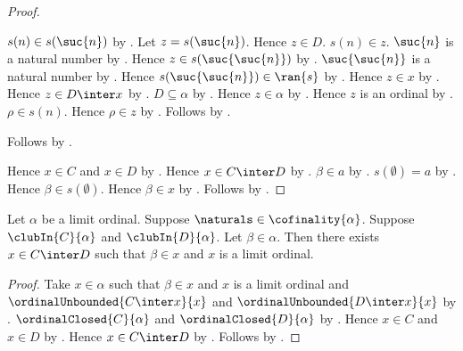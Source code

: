 \begin{proof}
\begin{subproof}
\begin{subproof}
            $s(n)\in s(\suc{n})$
                by .
            Let $z=s(\suc{n})$.
            Hence $z\in D$.
            $s(n)\in z$.
            $\suc{n}$ is a natural number by .
            Hence $z\in s(\suc{\suc{n}})$
                by .
            $\suc{\suc{n}}$ is a natural number
                by .
            Hence $s(\suc{\suc{n}})\in\ran{s}$
                by .
            Hence $z\in x$ by .
            Hence $z\in D\inter x$ by .
            $D\subseteq\alpha$ by .
            Hence $z\in\alpha$ by .
            Hence $z$ is an ordinal by .
            $\rho\in s(n)$.
            Hence $\rho\in z$ by .
            Follows by \auto.
        \end{subproof}
        Follows by .
    \end{subproof}
    Hence $x\in C$ and $x\in D$ by .
    Hence $x\in C\inter D$ by .
    $\beta\in a$ by .
    $s(\emptyset)=a$ by .
    Hence $\beta\in s(\emptyset)$.
    Hence $\beta\in x$ by .
    Follows by \auto.
\end{proof}

\begin{theorem}\label{two_clubs_have_common_point_above}
    Let $\alpha$ be a limit ordinal.
    Suppose $\naturals\in\cofinality{\alpha}$.
    Suppose $\clubIn{C}{\alpha}$ and $\clubIn{D}{\alpha}$.
    Let $\beta\in\alpha$.
    Then there exists $x\in C\inter D$ such that
        $\beta\in x$ and $x$ is a limit ordinal.
\end{theorem}
\begin{proof}
    Take $x\in\alpha$ such that $\beta\in x$ and
        $x$ is a limit ordinal and
        $\ordinalUnbounded{C\inter x}{x}$ and
        $\ordinalUnbounded{D\inter x}{x}$
        by .
    $\ordinalClosed{C}{\alpha}$ and $\ordinalClosed{D}{\alpha}$
        by .
    Hence $x\in C$ and $x\in D$ by .
    Hence $x\in C\inter D$ by .
    Follows by \auto.
\end{proof}

